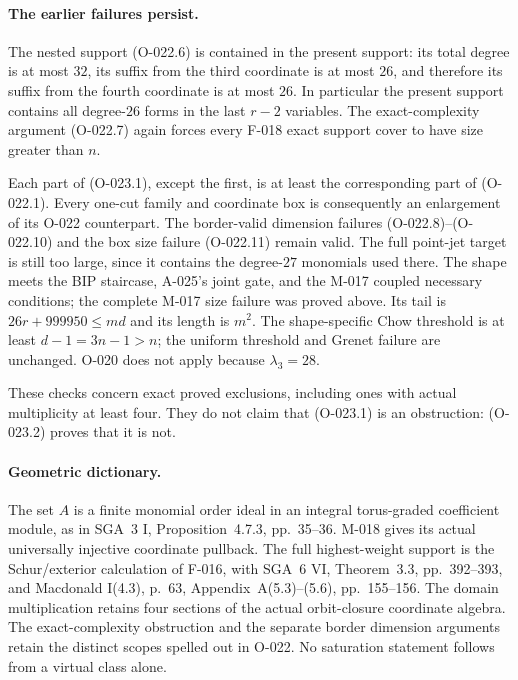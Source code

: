 \paragraph{The earlier failures persist.}
The nested support (O-022.6) is contained in the present
support: its total degree is at most $32$, its suffix
from the third coordinate is at most $26$, and therefore
its suffix from the fourth coordinate is at most $26$.
In particular the present support contains all degree-$26$
forms in the last $r-2$ variables. The exact-complexity
argument (O-022.7) again forces every F-018 exact support
cover to have size greater than $n$.

Each part of (O-023.1), except the first, is at least
the corresponding part of (O-022.1).
Every one-cut family and coordinate box is consequently
an enlargement of its O-022 counterpart. The border-valid
dimension failures (O-022.8)--(O-022.10) and the box
size failure (O-022.11) remain valid.
The full point-jet target is still too large, since it
contains the degree-$27$ monomials used there.
The shape meets the BIP staircase, A-025's joint gate,
and the M-017 coupled necessary conditions; the complete
M-017 size failure was proved above.
Its tail is $26r+999950\leq md$ and its length is $m^2$.
The shape-specific Chow threshold is at least
$d-1=3n-1>n$; the uniform threshold and Grenet failure
are unchanged. O-020 does not apply because $\lambda_3=28$.

These checks concern exact proved exclusions, including
ones with actual multiplicity at least four. They do not
claim that (O-023.1) is an obstruction: (O-023.2)
proves that it is not.

\paragraph{Geometric dictionary.}
The set $A$ is a finite monomial order ideal in an integral
torus-graded coefficient module, as in SGA~3 I,
Proposition~4.7.3, pp.~35--36. M-018 gives its actual
universally injective coordinate pullback. The full
highest-weight support is the Schur/exterior calculation
of F-016, with SGA~6 VI, Theorem~3.3, pp.~392--393,
and Macdonald I(4.3), p.~63, Appendix~A(5.3)--(5.6),
pp.~155--156. The domain multiplication retains four
sections of the actual orbit-closure coordinate algebra.
The exact-complexity obstruction and the separate
border dimension arguments retain the distinct scopes
spelled out in O-022. No saturation statement follows
from a virtual class alone.
